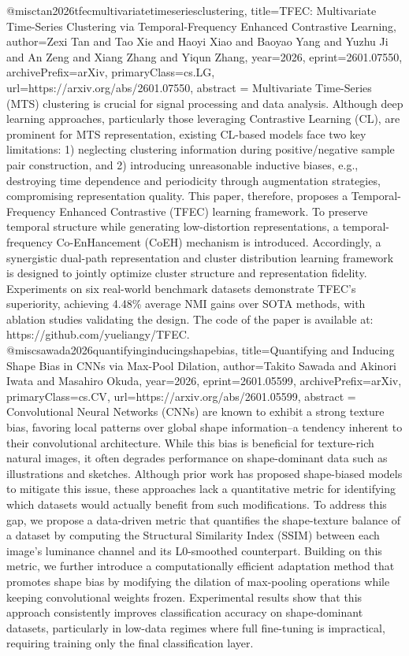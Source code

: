 {}@misc{tan2026tfecmultivariatetimeseriesclustering,
      title={TFEC: Multivariate Time-Series Clustering via Temporal-Frequency Enhanced Contrastive Learning}, 
      author={Zexi Tan and Tao Xie and Haoyi Xiao and Baoyao Yang and Yuzhu Ji and An Zeng and Xiang Zhang and Yiqun Zhang},
      year={2026},
      eprint={2601.07550},
      archivePrefix={arXiv},
      primaryClass={cs.LG},
      url={https://arxiv.org/abs/2601.07550},
      abstract = {Multivariate Time-Series (MTS) clustering is crucial for signal processing and data analysis. Although deep learning approaches, particularly those leveraging Contrastive Learning (CL), are prominent for MTS representation, existing CL-based models face two key limitations: 1) neglecting clustering information during positive/negative sample pair construction, and 2) introducing unreasonable inductive biases, e.g., destroying time dependence and periodicity through augmentation strategies, compromising representation quality. This paper, therefore, proposes a Temporal-Frequency Enhanced Contrastive (TFEC) learning framework. To preserve temporal structure while generating low-distortion representations, a temporal-frequency Co-EnHancement (CoEH) mechanism is introduced. Accordingly, a synergistic dual-path representation and cluster distribution learning framework is designed to jointly optimize cluster structure and representation fidelity. Experiments on six real-world benchmark datasets demonstrate TFEC's superiority, achieving 4.48\% average NMI gains over SOTA methods, with ablation studies validating the design. The code of the paper is available at: https://github.com/yueliangy/TFEC.}
}@misc{sawada2026quantifyinginducingshapebias,
      title={Quantifying and Inducing Shape Bias in CNNs via Max-Pool Dilation}, 
      author={Takito Sawada and Akinori Iwata and Masahiro Okuda},
      year={2026},
      eprint={2601.05599},
      archivePrefix={arXiv},
      primaryClass={cs.CV},
      url={https://arxiv.org/abs/2601.05599},
      abstract = {Convolutional Neural Networks (CNNs) are known to exhibit a strong texture bias, favoring local patterns over global shape information--a tendency inherent to their convolutional architecture. While this bias is beneficial for texture-rich natural images, it often degrades performance on shape-dominant data such as illustrations and sketches. Although prior work has proposed shape-biased models to mitigate this issue, these approaches lack a quantitative metric for identifying which datasets would actually benefit from such modifications. To address this gap, we propose a data-driven metric that quantifies the shape-texture balance of a dataset by computing the Structural Similarity Index (SSIM) between each image's luminance channel and its L0-smoothed counterpart. Building on this metric, we further introduce a computationally efficient adaptation method that promotes shape bias by modifying the dilation of max-pooling operations while keeping convolutional weights frozen. Experimental results show that this approach consistently improves classification accuracy on shape-dominant datasets, particularly in low-data regimes where full fine-tuning is impractical, requiring training only the final classification layer.}
}

